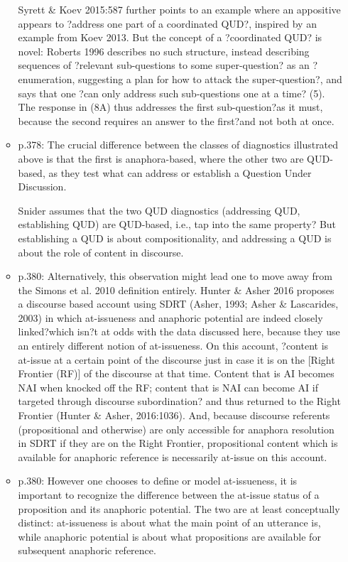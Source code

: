 \documentclass[11pt,fleqn]{article}
\newcommand{\6}{\mbox{$[\hspace*{-.6mm}[$}}
\newcommand{\9}{\mbox{$]\hspace*{-.6mm}]$}}
\begin{document}
\begin{itemize}
\begin{itemize}
Syrett \& Koev 2015:587 further points to an example where an appositive appears to ?address one part of a coordinated QUD?, inspired by an example from Koev 2013. But the concept of a ?coordinated QUD? is novel: Roberts 1996 describes no such structure, instead describing sequences of ?relevant sub-questions to some super-question? as an ?enumeration, suggesting a plan for how to attack the super-question?, and says that one ?can only address such sub-questions one at a time? (5). The response in (8A) thus addresses the first sub-question?as it must, because the second requires an answer to the first?and not both at once. 

\item p.378: The crucial difference between the classes of diagnostics illustrated above is that the first is anaphora-based, where the other two are QUD-based, as they test what can address or establish a Question Under Discussion.

Snider assumes that the two QUD diagnostics (addressing QUD, establishing QUD) are QUD-based, i.e., tap into the same property? But establishing a QUD is about compositionality, and addressing a QUD is about the role of content in discourse.

\item p.380: Alternatively, this observation might lead one to move away from the Simons et al. 2010 definition entirely. Hunter \& Asher 2016 proposes a discourse based account using SDRT (Asher, 1993; Asher \& Lascarides, 2003) in which at-issueness and anaphoric potential are indeed closely linked?which isn?t at odds with the data discussed here, because they use an entirely different notion of at-issueness. On this account, ?content is at-issue at a certain point of the discourse just in case it is on the [Right Frontier (RF)] of the discourse at that time. Content that is AI becomes NAI when knocked off the RF; content that is NAI can become AI if targeted through discourse subordination? and thus returned to the Right Frontier (Hunter \& Asher, 2016:1036). And, because discourse referents (propositional and otherwise) are only accessible for anaphora resolution in SDRT if they are on the Right Frontier, propositional content which is available for anaphoric reference is necessarily at-issue on this account.

\item p.380: However one chooses to define or model at-issueness, it is important to recognize the difference between the at-issue status of a proposition and its anaphoric potential. The two are at least conceptually distinct: at-issueness is about what the main point of an utterance is, while anaphoric potential is about what propositions are available for subsequent anaphoric reference. 


\end{itemize}
\end{itemize}
\end{document}
